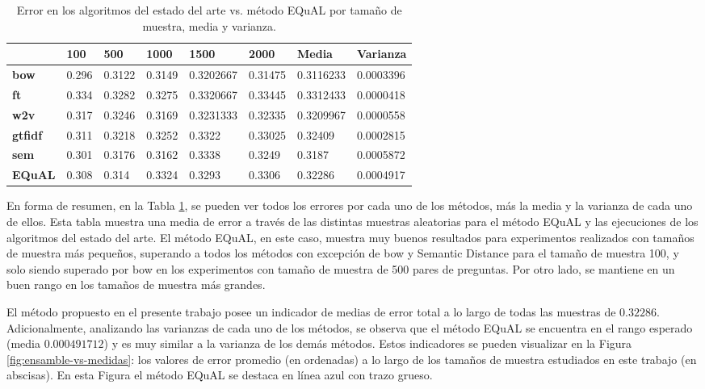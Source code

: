 \begin{table}[h!]
	\footnotesize
	\caption{Error en los algoritmos del estado del arte vs. método EQuAL por tamaño de muestra, media y varianza.}
	\begin{tabularx}{\textwidth}{XXXXXXXX}
		\toprule
		& \textbf{100} & \textbf{500} & \textbf{1000} & \textbf{1500} & \textbf{2000} & \textbf{Media} & \textbf{Varianza} \\
		\midrule
		\textbf{bow}      & 0.296 & 0.3122 & 0.3149 & 0.3202667 & 0.31475 & \cellcolor[HTML]{D9EAD3}0.3116233 & 0.0003396                          \\
		\textbf{ft}       & 0.334 & 0.3282 & 0.3275 & 0.3320667 & 0.33445 & 0.3312433                         & \cellcolor[HTML]{D9EAD3}0.0000418 \\
		\textbf{w2v}      & 0.317 & 0.3246 & 0.3169 & 0.3231333 & 0.32335 & 0.3209967                         & 0.0000558                         \\
		\textbf{gtfidf}   & 0.311 & 0.3218 & 0.3252 & 0.3322       & 0.33025 & 0.32409                              & 0.0002815                              \\
		\textbf{sem}      & 0.301 & 0.3176 & 0.3162 & 0.3338       & 0.3249  & 0.3187                               & 0.0005872                                \\
		\textbf{EQuAL} & 0.308 & 0.314  & 0.3324 & 0.3293       & 0.3306  & 0.32286                              & 0.0004917                              \\
		\bottomrule
	\end{tabularx}
	\label{tab:error-arte-equal}
\end{table}

\bigskip En forma de resumen, en la Tabla \ref{tab:error-arte-equal}, se pueden ver todos los errores por cada uno de los métodos, más la media y la varianza de cada uno de ellos. Esta tabla muestra una media de error a través de las distintas muestras aleatorias para el método EQuAL y las ejecuciones de los algoritmos del estado del arte. El método EQuAL, en este caso, muestra muy buenos resultados para experimentos realizados con tamaños de muestra más pequeños, superando a todos los métodos con excepción de bow y Semantic Distance para el tamaño de muestra 100, y solo siendo superado por bow en los experimentos con tamaño de muestra de 500 pares de preguntas. Por otro lado, se mantiene en un buen rango en los tamaños de muestra más grandes.

\bigskip El método propuesto en el presente trabajo posee un indicador de medias de error total a lo largo de todas las muestras de \(0.32286\). Adicionalmente, analizando las varianzas de cada uno de los métodos, se observa que el método EQuAL se encuentra en el rango esperado (media \(0.000491712\)) y es muy similar a la varianza de los demás métodos. Estos indicadores se pueden visualizar en la Figura \ref{fig:ensamble-vs-medidas}: los valores de error promedio (en ordenadas) a lo largo de los tamaños de muestra estudiados en este trabajo (en abscisas). En esta Figura el método EQuAL se destaca en línea azul con trazo grueso.

